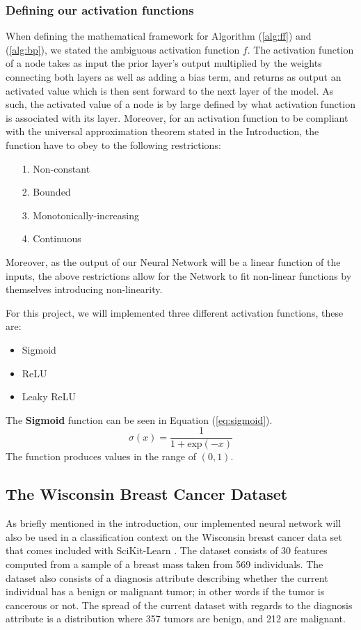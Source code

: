 \documentclass
[twocolumn,
secnumarabic,
nobibnotes,
aps,
prl,
reprint,
groupedaddress,
amsmath,
amssymb
]{revtex4-2}
\begin{document}
\subsubsection{Defining our activation functions}
When defining the mathematical framework for Algorithm (\ref{alg:ff}) and (\ref{alg:bp}), we stated the ambiguous activation function $f$. The activation function of a node takes as input the prior layer's output multiplied by the weights connecting both layers as well as adding a bias term, and returns as output an activated value which is then sent forward to the next layer of the model. As such, the activated value of a node is by large defined by what activation function is associated with its layer. Moreover, for an activation function to be compliant with the universal approximation theorem stated in the Introduction, the function have to obey to the following restrictions:
\begin{itemize}
  \item[1.] Non-constant
  \item[2.] Bounded
  \item[3.] Monotonically-increasing
  \item[4.] Continuous
\end{itemize}
Moreover, as the output of our Neural Network will be a linear function of the inputs, the above restrictions allow for the Network to fit non-linear functions by themselves introducing non-linearity.

For this project, we will implemented three different activation functions, these are:
\begin{itemize}
  \item Sigmoid
  \item ReLU
  \item Leaky ReLU
\end{itemize}

The \textbf{Sigmoid} function can be seen in Equation (\ref{eq:sigmoid}).
\begin{equation}
  \label{eq:sigmoid}
  \sigma(x) = \frac{1}{1 + \text{exp}(-x)}
\end{equation}
The function produces values in the range of $(0,1)$.



\subsection{The Wisconsin Breast Cancer Dataset}
As briefly mentioned in the introduction, our implemented neural network will also be used in a classification context on the Wisconsin breast cancer data set that comes included with SciKit-Learn \cite{scikit-learn}. The dataset consists of 30 features computed from a sample of a breast mass taken from 569 individuals. The dataset also consists of a diagnosis attribute describing whether the current individual has a benign or malignant tumor; in other words if the tumor is cancerous or not. The spread of the current dataset with regards to the diagnosis attribute is a distribution where 357 tumors are benign, and 212 are malignant.
\end{document}
